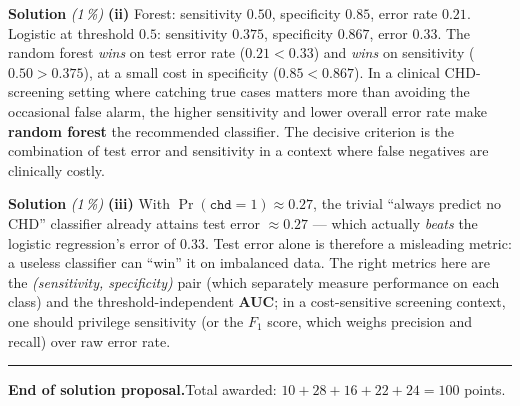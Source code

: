 \documentclass[11pt,a4paper]{article}
\newcommand{\subpoints}[1]{\textit{(#1\,\%)}}
\newcommand{\sol}{\noindent\textbf{Solution}}
\begin{document}
\medskip
\sol{} \subpoints{1} \textbf{(ii)} Forest: sensitivity $0.50$, specificity $0.85$, error rate $0.21$.
Logistic at threshold $0.5$: sensitivity $0.375$, specificity $0.867$, error $0.33$. The random forest
\emph{wins} on test error rate ($0.21<0.33$) and \emph{wins} on sensitivity ($0.50>0.375$), at a small
cost in specificity ($0.85<0.867$). In a clinical CHD-screening setting where catching true cases matters
more than avoiding the occasional false alarm, the higher sensitivity and lower overall error rate make
\textbf{random forest} the recommended classifier. The decisive criterion is the combination of
test error and sensitivity in a context where false negatives are clinically costly.

\medskip
\sol{} \subpoints{1} \textbf{(iii)} With $\Pr(\texttt{chd}=1)\approx 0.27$, the trivial ``always
predict no CHD'' classifier already attains test error $\approx 0.27$ --- which actually
\emph{beats} the logistic regression's error of $0.33$. Test error alone is therefore a misleading
metric: a useless classifier can ``win'' it on imbalanced data. The right metrics here are the
\emph{(sensitivity, specificity)} pair (which separately measure performance on each class) and the
threshold-independent \textbf{AUC}; in a cost-sensitive screening context, one should privilege
sensitivity (or the $F_1$ score, which weighs precision and recall) over raw error rate.

\vspace{1em}
\hrule
\vspace{0.5em}

\noindent\textbf{End of solution proposal.}\quad Total awarded: $10+28+16+22+24=100$ points.
\end{document}
